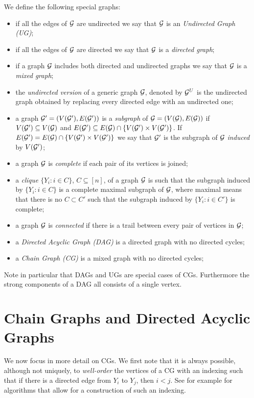 \begin{definition}
We define the following special graphs:
\begin{itemize}
\item if all the edges of $\mathcal{G}$ are undirected we say that $\mathcal{G}$ is an \emph{Undirected Graph (UG)};
\item if all the edges of $\mathcal{G}$ are directed we say that $\mathcal{G}$ is a \emph{directed graph};
\item if a graph $\mathcal{G}$ includes both directed and undirected graphs we say that $\mathcal{G}$ is a \emph{mixed graph};
\item the \emph{undirected version} of a generic graph $\mathcal{G}$, denoted by $\mathcal{G}^{U}$ is the undirected graph obtained by replacing every directed edge with an undirected one;
\item a graph $\mathcal{G}'=(V(\mathcal{G}'),E(\mathcal{G}'))$ is a \emph{subgraph} of $\mathcal{G}=(V(\mathcal{G}),E(\mathcal{G}))$ if $V(\mathcal{G}')\subseteq V(\mathcal{G})$ and $E(\mathcal{G}')\subseteq E(\mathcal{G})\cap \{V(\mathcal{G}')\times V(\mathcal{G}')\}$.  If $E(\mathcal{G}')= E(\mathcal{G})\cap \{V(\mathcal{G}')\times V(\mathcal{G}')\}$ we say that $\mathcal{G}'$ is the subgraph of $\mathcal{G}$ \emph{induced} by $V(\mathcal{G}')$;
\item a graph $\mathcal{G}$ is \emph{complete} if each pair of its vertices is joined;
\item a \emph{clique} $\{Y_i:i\in C\}$, $C\subseteq [n]$, of a graph $\mathcal{G}$ is such that the subgraph induced by $\{Y_i:i\in C\}$ is a complete maximal subgraph of $\mathcal{G}$, where maximal means that there is no $C\subset C'$ such that the subgraph induced by $\{Y_i:i\in C'\}$ is complete;
\item a graph $ \mathcal{G}$ is \emph{connected} if there is a trail between every pair of vertices in $\mathcal{G}$;
\item a \emph{Directed Acyclic Graph (DAG)} is a directed graph with no directed cycles;
\item a \emph{Chain Graph (CG)} is a mixed graph with no directed cycles;
\end{itemize}
\end{definition}
Note in particular that DAGs and UGs are special cases of CGs. Furthermore the strong components of a DAG all consists of a single vertex. 

\section{Chain Graphs and Directed Acyclic Graphs}
We now focus in more detail on CGs. We first note that it is always possible, although not uniquely, to \textit{well-order} the vertices of a CG with an indexing such that if there is a directed edge from $Y_i$ to $Y_j$, then $i<j$.  See for example \citet{Cowell1999a} for algorithms that allow for a construction of such an indexing.  

